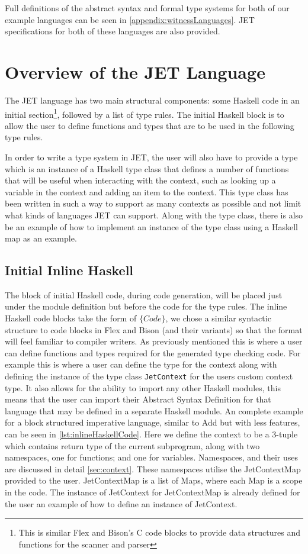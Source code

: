 Full definitions of the abstract syntax and formal type systems for both of our example languages can be seen in \autoref{appendix:witnessLanguages}.
JET specifications for both of these languages are also provided.

\section{Overview of the JET Language}
The JET language has two main structural components: some Haskell code in an initial section\footnote{This is similar Flex and Bison's C code blocks to provide data structures and functions for the scanner and parser}, followed by a list of type rules.
The initial Haskell block is to allow the user to define functions and types that are to be used in the following type rules.

In order to write a type system in JET, the user will also have to provide a type which is an instance of a Haskell type class that defines a number of functions that will be useful when interacting with the context, such as looking up a variable in the context and adding an item to the context.
This type class has been written in such a way to support as many contexts as possible and not limit what kinds of languages JET can support.
Along with the type class, there is also be an example of how to implement an instance of the type class using a Haskell map as an example.

\subsection{Initial Inline Haskell}
The block of initial Haskell code, during code generation, will be placed just under the module definition but before the code for the type rules.
The inline Haskell code blocks take the form of $\{Code\}$, we chose a similar syntactic structure to code blocks in Flex and Bison (and their variants) so that the format will feel familiar to compiler writers.
As previously mentioned this is where a user can define functions and types required for the generated type checking code.
For example this is where a user can define the type for the context along with defining the instance of the type class \texttt{JetContext} for the users custom context type.
It also allows for the ability to import any other Haskell modules, this means that the user can import their Abstract Syntax Definition for that language that may be defined in a separate Haskell module.
An complete example for a block structured imperative language, similar to Add but with less features, can be seen in \autoref{lst:inlineHaskellCode}.
Here we define the context to be a 3-tuple which contains return type of the current subprogram, along with two namespaces, one for functions; and one for variables.
Namespaces, and their uses are discussed in detail \autoref{sec:context}.
These namespaces utilise the JetContextMap provided to the user.
JetContextMap is a list of Maps, where each Map is a scope in the code.
The instance of JetContext for JetContextMap is already defined for the user an example of how to define an instance of JetContext.

